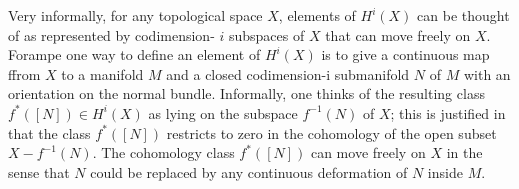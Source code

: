   Very informally, for any topological space $X$, elements of $H^i(X)$ can be thought of as represented by codimension- $i$ subspaces of $X$ that can move freely on $X$. Forampe one way to define an element of $H^i(X)$ is to give a continuous map ffrom $X$ to a manifold $M$ and a closed codimension-i submanifold $N$ of $M$ with an orientation on the normal bundle. Informally, one thinks of the resulting class $f^*([N]) \in H^i(X)$ as lying on the subspace $f^{-1}(N)$ of $X$; this is justified in that the class $f^*([N])$ restricts to zero in the cohomology of the open subset $X-f^{-1}(N)$. The cohomology class $f^*([N])$ can move freely on $X$ in the sense that $N$ could be replaced by any continuous deformation of $N$ inside $M$.















